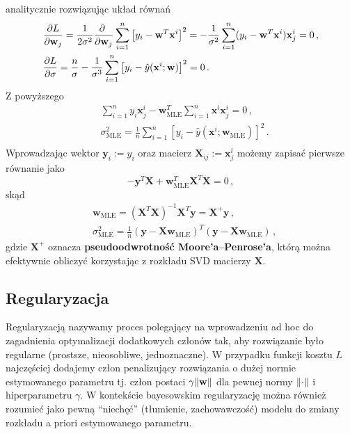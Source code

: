 \documentclass{myclass}
\numberwithin{equation}{section}
\begin{document}
analitycznie rozwiązując układ równań
\begin{equation}
    \begin{split}
        &\pdv{L}{\mathbf{w}_j} = \frac{1}{2\sigma^2}\pdv{~}{\mathbf{w}_j}\sum_{i=1}^n\left[y_i - \mathbf{w}^T\mathbf{x}^i\right]^2 = -\frac{1}{\sigma^2}\sum_{i=1}^n (y_i - \mathbf{w}^T\mathbf{x}^i)\mathbf{x}^i_j = 0\,,\\
        &\pdv{L}{\sigma} = \frac{n}{\sigma} - \frac{1}{\sigma^3}\sum_{i=1}^n \left[y_i - \hat{y}(\mathbf{x}^i; \mathbf{w})\right]^2 = 0\,.
    \end{split}
\end{equation}
Z powyższego
\begin{equation}
    \begin{split}
        &\sum_{i=1}^n y_i\mathbf{x}^i_j - \mathbf{w}_\mathrm{MLE}^T\sum_{i=1}^n\mathbf{x}^i\mathbf{x}^i_j = 0\,,\\
        &\sigma_\mathrm{MLE}^2 = \frac{1}{n} \sum_{i=1}^n \left[y_i - \hat{y}(\mathbf{x}^i; \mathbf{w}_\mathrm{MLE})\right]^2\,.\\
    \end{split}
\end{equation}
Wprowadzając wektor \(\mathbf{y}_i := y_i\) oraz macierz \(\mathbf{X}_{ij} := \mathbf{x}^i_j\) możemy
zapisać pierwsze równanie jako
\begin{equation}
    -\mathbf{y}^T\mathbf{X} + \mathbf{w}^T_\mathrm{MLE} \mathbf{X}^T\mathbf{X} = 0\,,
\end{equation}
skąd
\begin{equation}\boxed{
    \begin{split}
        &\mathbf{w}_\mathrm{MLE} = \left(\mathbf{X}^T\mathbf{X}\right)^{-1}\mathbf{X}^T\mathbf{y} = \mathbf{X}^+\mathbf{y}\,,\\
        &\sigma_\mathrm{MLE}^2 = \frac{1}{n}\left(\mathbf{y} - \mathbf{X}\mathbf{w}_\mathrm{MLE}\right)^T\left(\mathbf{y} - \mathbf{X}\mathbf{w}_\mathrm{MLE}\right)\,,
    \end{split}
}\end{equation}
gdzie \(\mathbf{X}^+\) oznacza \textbf{pseudoodwrotność Moore'a--Penrose'a}, którą można efektywnie
obliczyć korzystając z rozkładu SVD macierzy \(\mathbf{X}\).


\subsection{Regularyzacja}

Regularyzacją  nazywamy proces polegający na wprowadzeniu ad hoc do zagadnienia optymalizacji
dodatkowych członów tak, aby rozwiązanie było regularne (prostsze, nieosobliwe, jednoznaczne). W
przypadku funkcji kosztu \(L\) najczęściej dodajemy człon penalizujący rozwiązania o dużej normie
estymowanego parametru tj. człon postaci \(\gamma \norm{\mathbf{w}}\) dla pewnej normy
\(\norm{\cdot}\) i hiperparametru \(\gamma\). W kontekście bayesowskim regularyzację można również
rozumieć jako pewną \enquote{niechęć} (tłumienie, zachowawczość) modelu do zmiany rozkładu a priori
estymowanego parametru.
\end{document}

